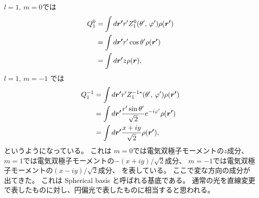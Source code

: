 \documentclass[../../master.tex]{subfiles}
\begin{document}
\(l=1,\,m=0\)では
\begin{align}
    Q_1^0
    &= \int d\vb*{r'}  r' Z_1^0 (\theta',\,\varphi') \rho(\vb*{r'})\\
    &= \int d\vb*{r'}  r' \cos\theta' \rho(\vb*{r'})\\
    &= \int d\vb*{r'} z \rho(\vb*{r}),
\end{align}
\(l=1,\,m=-1\) では
\begin{align}
    Q_1^{- 1}
    &= \int d\vb*{r'}  r' Z_1^{- 1*} (\theta',\,\varphi') \rho(\vb*{r'})\\
    &= \int d\vb*{r'} \frac{r'\sin\theta'}{\sqrt{2}}e^{- i\varphi'} \rho(\vb*{r'})\\
    &= \int d\vb*{r'} \frac{x+iy}{\sqrt{2}} \rho(\vb*{r'}),
\end{align}
というようになっている。
これは
\(m=0\)では電気双極子モーメントの\(z\)成分、
\(m=1\)では電気双極子モーメントの\(-(x+iy)/\sqrt{2}\)成分、
\(m=-1\)では電気双極子モーメントの\((x-iy)/\sqrt{2}\)成分、
を表している。
ここで変な方向の成分が出てきた。
これは Spherical basis と呼ばれる基底である。
通常の光を直線変更で表したものに対し、円偏光で表したものに相当すると思われる。

\end{document}

